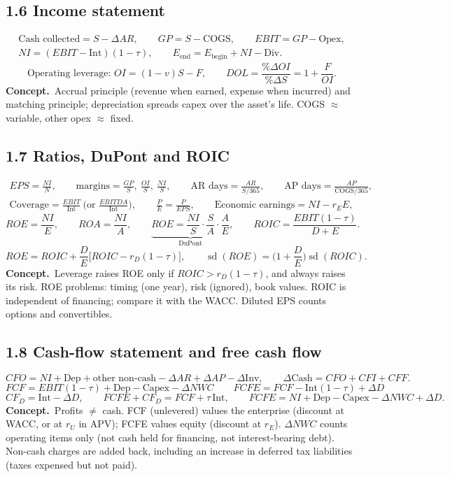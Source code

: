 \documentclass[10pt,a4paper]{article}
\newcommand{\blk}[1]{\subsection*{\color{blue!55!black}#1}}
\newcommand{\idea}{\textbf{Concept.}~}
\begin{document}
\blk{1.6 Income statement}
\begin{gather*}
\text{Cash collected}=S-\Delta AR,\qquad GP=S-\text{COGS},\qquad EBIT = GP-\text{Opex},\\
NI=(EBIT-\text{Int})(1-\tau),\qquad E_{\text{end}}=E_{\text{begin}}+NI-\text{Div}.
\end{gather*}
\[
\text{Operating leverage: } OI=(1-v)S-F,\qquad DOL=\frac{\%\Delta OI}{\%\Delta S}=1+\frac{F}{OI}.
\]
\idea Accrual principle (revenue when earned, expense when incurred) and matching principle;
depreciation spreads capex over the asset's life. COGS $\approx$ variable, other opex $\approx$ fixed.

\blk{1.7 Ratios, DuPont and ROIC}
\begin{gather*}
EPS=\frac{NI}{N},\qquad \text{margins}=\frac{GP}{S},\ \frac{OI}{S},\ \frac{NI}{S},\qquad
\text{AR days}=\frac{AR}{S/365},\qquad \text{AP days}=\frac{AP}{\text{COGS}/365},\\
\text{Coverage}=\frac{EBIT}{\text{Int}}\ \Big(\text{or }\frac{EBITDA}{\text{Int}}\Big),\qquad
\frac PE=\frac{P}{EPS},\qquad \text{Economic earnings}=NI-r_E E,
\end{gather*}
\[
ROE=\frac{NI}{E},\qquad ROA=\frac{NI}{A},\qquad
\underbrace{ROE=\frac{NI}{S}\cdot\frac{S}{A}\cdot\frac{A}{E}}_{\text{DuPont}},\qquad
ROIC=\frac{EBIT(1-\tau)}{D+E}.
\]
\[
ROE = ROIC + \frac{D}{E}\big[ROIC-r_D(1-\tau)\big],\qquad
\operatorname{sd}(ROE)=\Big(1+\frac DE\Big)\operatorname{sd}(ROIC).
\]
\idea Leverage raises ROE only if $ROIC>r_D(1-\tau)$, and always raises its risk. ROE problems:
timing (one year), risk (ignored), book values. ROIC is independent of financing; compare it with the
WACC. Diluted EPS counts options and convertibles.

\blk{1.8 Cash-flow statement and free cash flow}
\[
CFO = NI + \text{Dep} + \text{other non-cash} - \Delta AR + \Delta AP - \Delta\text{Inv},\qquad
\Delta\text{Cash}=CFO+CFI+CFF.
\]
\[
\boxed{FCF = EBIT(1-\tau)+\text{Dep}-\text{Capex}-\Delta NWC}\qquad
\boxed{FCFE = FCF - \text{Int}(1-\tau)+\Delta D}
\]
\[
CF_D=\text{Int}-\Delta D,\qquad FCFE+CF_D = FCF+\tau\,\text{Int},\qquad
FCFE = NI+\text{Dep}-\text{Capex}-\Delta NWC+\Delta D.
\]
\idea Profits $\neq$ cash. FCF (unlevered) values the enterprise (discount at WACC, or at $r_U$ in
APV); FCFE values equity (discount at $r_E$). $\Delta NWC$ counts operating items only (not cash held
for financing, not interest-bearing debt). Non-cash charges are added back, including an increase in
deferred tax liabilities (taxes expensed but not paid).
\end{document}
